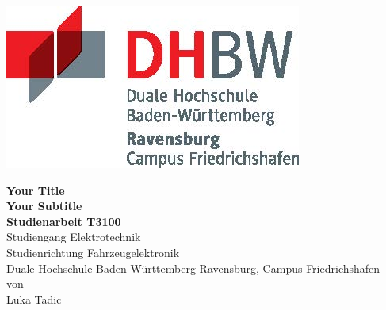 \documentclass{scrbook} %
\newcommand{\titel}{Your Title}
\newcommand{\untertitel}{Your Subtitle}
\newcommand{\arbeit}{Studienarbeit T3100}
\newcommand{\studiengang}{Elektrotechnik}
\newcommand{\studienrichtung}{Fahrzeugelektronik}
\newcommand{\autor}{Luka Tadic}
\begin{document}
\thispagestyle{plain}
\hypersetup{pageanchor=false}
\begin{titlepage}
\enlargethispage{4.0cm}
\sffamily  %

\parbox{0.5\linewidth}{
\begin{flushleft}
\end{flushleft}
}
\parbox{0.5\linewidth}{
\begin{flushright}
    \includegraphics[width=0.4\linewidth]{images/DHBW_d_R_FN_46mm_4c}\\[5ex]
\end{flushright}
}

\begin{center}

{\fontsize{20.74pt}{24pt}\selectfont
\textbf{\titel}\\[1.5ex]}
{\fontsize{14pt}{17pt}\selectfont
\textbf{\untertitel}\\[5ex]}
{\fontsize{17pt}{20pt}\selectfont
\textbf{\arbeit}\\[2ex]}
{\fontsize{14pt}{17pt}\selectfont
Studiengang \studiengang\\[2ex]}
{\fontsize{12pt}{14pt}\selectfont
Studienrichtung \studienrichtung\\[1ex]
Duale Hochschule Baden-Württemberg Ravensburg, Campus Friedrichshafen\\[5ex]
von\\[1ex]
\autor\\[15ex]}

\end{center}


\end{titlepage}
\end{document}

